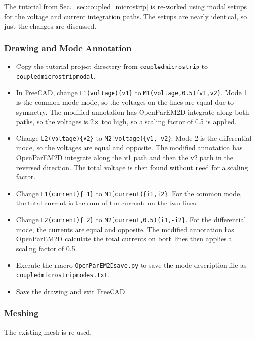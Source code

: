 \documentclass[titlepage]{article}
\renewcommand\_{\textunderscore\linebreak[1]}
\begin{document}
The tutorial from Sec.~\ref{sec:coupled_microstrip} is re-worked using modal setups for the voltage and current integration paths.  The setups are nearly identical, so just the changes are discussed.

\subsubsection{Drawing and Mode Annotation}

\begin{itemize}
\item Copy the tutorial project directory from \texttt{coupled\_microstrip} to \texttt{coupled\_microstrip\_modal}.
\item In FreeCAD, change \texttt{\_L1(voltage)\{v1\}} to \texttt{\_M1(voltage,0.5)\{v1,v2\}}.  Mode 1 is the common-mode mode, so the voltages on the lines are equal due to symmetry.  The modified annotation has OpenParEM2D integrate along both paths, so the voltages is 2$\times$ too high, so a scaling factor of 0.5 is applied.
\item Change \texttt{\_L2(voltage)\{v2\}} to \texttt{\_M2(voltage)\{v1,-v2\}}.  Mode 2 is the differential mode, so the voltages are equal and opposite.  The modified annotation has OpenParEM2D integrate along the v1 path and then the v2 path in the reversed direction.  The total voltage is then found without need for a scaling factor.
\item Change \texttt{\_L1(current)\{i1\}} to \texttt{\_M1(current)\{i1,i2\}}.  For the common mode, the total current is the sum of the currents on the two lines.
\item Change \texttt{\_L2(current)\{i2\}} to \texttt{\_M2(current,0.5)\{i1,-i2\}}.  For the differential mode, the currents are equal and opposite.  The modified annotation has OpenParEM2D calculate the total currents on both lines then applies a scaling factor of 0.5.
\item Execute the macro \texttt{OpenParEM2D\_save.py} to save the mode description file as \texttt{coupled\_microstrip\_modes.txt}.
\item Save the drawing and exit FreeCAD.
\end{itemize}

\subsubsection{Meshing}

The existing mesh is re-used.
\end{document}
